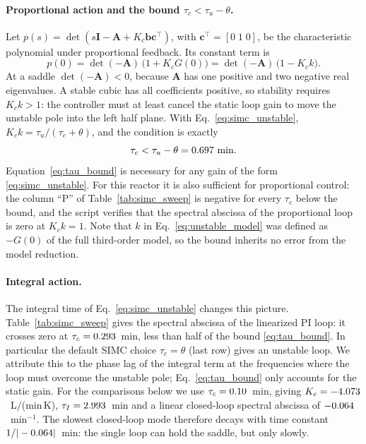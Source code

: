 \paragraph{Proportional action and the bound $\tau_c<\tau_u-\theta$.}
Let $p(s)=\det(s\mathbf{I}-\mathbf{A}+K_c\mathbf{b}\mathbf{c}^\top)$, with $\mathbf{c}^\top=[0\;1\;0]$, be the characteristic polynomial under proportional feedback. Its constant term is
\begin{equation}
p(0)=\det(-\mathbf{A})\,\bigl(1+K_cG(0)\bigr)=\det(-\mathbf{A})\,\bigl(1-K_ck\bigr).
\end{equation}
At a saddle $\det(-\mathbf{A})<0$, because $\mathbf{A}$ has one positive and two negative real eigenvalues. A stable cubic has all coefficients positive, so stability requires $K_ck>1$: the controller must at least cancel the static loop gain to move the unstable pole into the left half plane. With Eq.~\eqref{eq:simc_unstable}, $K_ck=\tau_u/(\tau_c+\theta)$, and the condition is exactly
\begin{equation}
\tau_c<\tau_u-\theta=0.697~\text{min}.
\label{eq:tau_bound}
\end{equation}
Equation~\eqref{eq:tau_bound} is necessary for any gain of the form \eqref{eq:simc_unstable}. For this reactor it is also sufficient for proportional control: the column ``P'' of Table~\ref{tab:simc_sweep} is negative for every $\tau_c$ below the bound, and the script verifies that the spectral abscissa of the proportional loop is zero at $K_ck=1$. Note that $k$ in Eq.~\eqref{eq:unstable_model} was defined as $-G(0)$ of the full third-order model, so the bound inherits no error from the model reduction.

\paragraph{Integral action.}
The integral time of Eq.~\eqref{eq:simc_unstable} changes this picture. Table~\ref{tab:simc_sweep} gives the spectral abscissa of the linearized PI loop: it crosses zero at $\tau_c=0.293$~min, less than half of the bound \eqref{eq:tau_bound}. In particular the default SIMC choice $\tau_c=\theta$ (last row) gives an unstable loop. We attribute this to the phase lag of the integral term at the frequencies where the loop must overcome the unstable pole; Eq.~\eqref{eq:tau_bound} only accounts for the static gain. For the comparisons below we use $\tau_c=0.10$~min, giving $K_c=-4.073$~L/(min\,K), $\tau_I=2.993$~min and a linear closed-loop spectral abscissa of $-0.064$~min$^{-1}$. The slowest closed-loop mode therefore decays with time constant $1/|-0.064|$~min: the single loop can hold the saddle, but only slowly.

